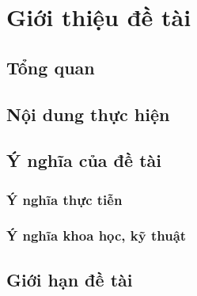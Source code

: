 \chapter{Giới thiệu đề tài} \label{chapter:introduction}
\section{Tổng quan}

\section{Nội dung thực hiện}



\section{Ý nghĩa của đề tài}
\subsection{Ý nghĩa thực tiễn}



\subsection{Ý nghĩa khoa học, kỹ thuật}


\section{Giới hạn đề tài}
